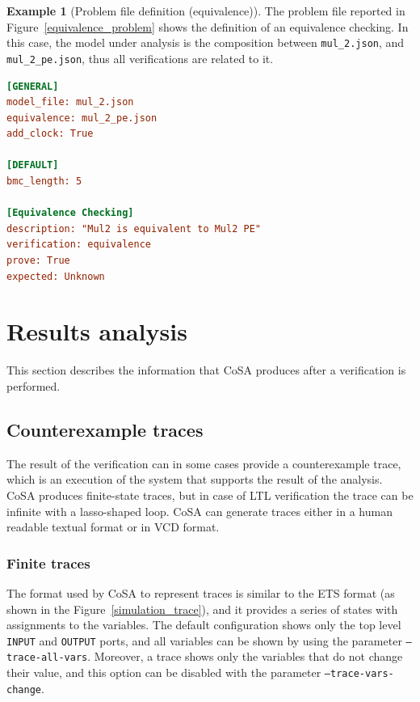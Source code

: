 \documentclass{article}
\theoremstyle{definition}
\newtheorem{example}{Example}[section]
\begin{document}
\begin{example}[Problem file definition (equivalence)]
The problem file reported in Figure~\ref{equivalence_problem} shows
the definition of an equivalence checking. In this case, the model
under analysis is the composition between \texttt{mul\_2.json}, and
\texttt{mul\_2\_pe.json}, thus all verifications are related to it.
  
\begin{lstlisting}[frame=single,language=Ini,caption=Problem file in \texttt{examples/mul\_2/problem\_1.txt},label=equivalence_problem]
[GENERAL]
model_file: mul_2.json
equivalence: mul_2_pe.json
add_clock: True

[DEFAULT]
bmc_length: 5

[Equivalence Checking]
description: "Mul2 is equivalent to Mul2 PE"
verification: equivalence
prove: True
expected: Unknown
\end{lstlisting}
\end{example}

\section{Results analysis}
\label{sec:results_analysis}

This section describes the information that CoSA produces after a
verification is performed.

\subsection{Counterexample traces}

The result of the verification can in some cases provide a
counterexample trace, which is an execution of the system that
supports the result of the analysis. CoSA produces finite-state
traces, but in case of LTL verification the trace can be infinite with
a lasso-shaped loop. CoSA can generate traces either in a human
readable textual format or in VCD format.

\subsubsection{Finite traces}

The format used by CoSA to represent traces is similar to the ETS
format (as shown in the Figure~\ref{simulation_trace}), and it
provides a series of states with assignments to the variables. The
default configuration shows only the top level \texttt{INPUT} and
\texttt{OUTPUT} ports, and all variables can be shown by using the
parameter \texttt{--trace-all-vars}. Moreover, a trace shows only the
variables that do not change their value, and this option can be
disabled with the parameter \texttt{--trace-vars-change}.
\end{document}
